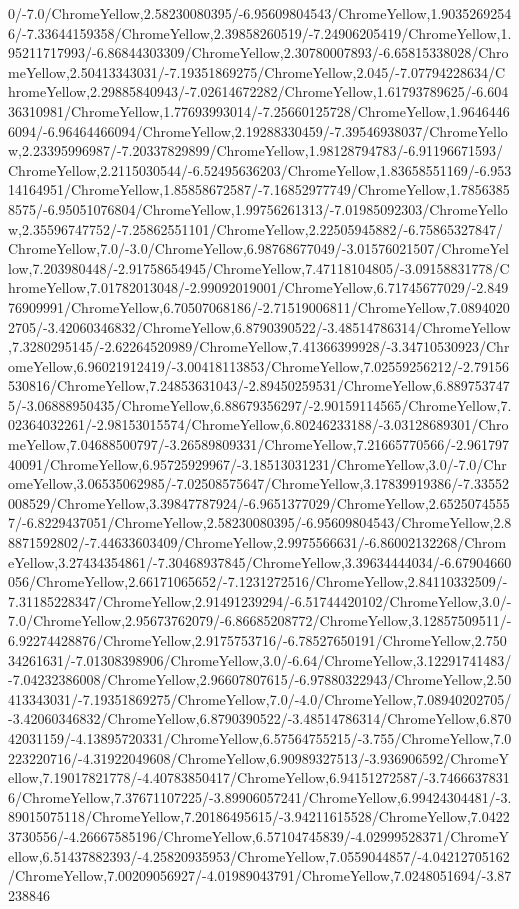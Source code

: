 {\begin{tikzternal}
{0/-7.0/ChromeYellow,2.58230080395/-6.95609804543/ChromeYellow,1.90352692546/-7.33644159358/ChromeYellow,2.39858260519/-7.24906205419/ChromeYellow,1.95211717993/-6.86844303309/ChromeYellow,2.30780007893/-6.65815338028/ChromeYellow,2.50413343031/-7.19351869275/ChromeYellow,2.045/-7.07794228634/ChromeYellow,2.29885840943/-7.02614672282/ChromeYellow,1.61793789625/-6.60436310981/ChromeYellow,1.77693993014/-7.25660125728/ChromeYellow,1.96464466094/-6.96464466094/ChromeYellow,2.19288330459/-7.39546938037/ChromeYellow,2.23395996987/-7.20337829899/ChromeYellow,1.98128794783/-6.91196671593/ChromeYellow,2.2115030544/-6.52495636203/ChromeYellow,1.83658551169/-6.95314164951/ChromeYellow,1.85858672587/-7.16852977749/ChromeYellow,1.78563858575/-6.95051076804/ChromeYellow,1.99756261313/-7.01985092303/ChromeYellow,2.35596747752/-7.25862551101/ChromeYellow,2.22505945882/-6.75865327847/ChromeYellow,7.0/-3.0/ChromeYellow,6.98768677049/-3.01576021507/ChromeYellow,7.203980448/-2.91758654945/ChromeYellow,7.47118104805/-3.09158831778/ChromeYellow,7.01782013048/-2.99092019001/ChromeYellow,6.71745677029/-2.84976909991/ChromeYellow,6.70507068186/-2.71519006811/ChromeYellow,7.08940202705/-3.42060346832/ChromeYellow,6.8790390522/-3.48514786314/ChromeYellow,7.3280295145/-2.62264520989/ChromeYellow,7.41366399928/-3.34710530923/ChromeYellow,6.96021912419/-3.00418113853/ChromeYellow,7.02559256212/-2.79156530816/ChromeYellow,7.24853631043/-2.89450259531/ChromeYellow,6.8897537475/-3.06888950435/ChromeYellow,6.88679356297/-2.90159114565/ChromeYellow,7.02364032261/-2.98153015574/ChromeYellow,6.80246233188/-3.03128689301/ChromeYellow,7.04688500797/-3.26589809331/ChromeYellow,7.21665770566/-2.96179740091/ChromeYellow,6.95725929967/-3.18513031231/ChromeYellow,3.0/-7.0/ChromeYellow,3.06535062985/-7.02508575647/ChromeYellow,3.17839919386/-7.33552008529/ChromeYellow,3.39847787924/-6.9651377029/ChromeYellow,2.65250745557/-6.8229437051/ChromeYellow,2.58230080395/-6.95609804543/ChromeYellow,2.88871592802/-7.44633603409/ChromeYellow,2.9975566631/-6.86002132268/ChromeYellow,3.27434354861/-7.30468937845/ChromeYellow,3.39634444034/-6.67904660056/ChromeYellow,2.66171065652/-7.1231272516/ChromeYellow,2.84110332509/-7.31185228347/ChromeYellow,2.91491239294/-6.51744420102/ChromeYellow,3.0/-7.0/ChromeYellow,2.95673762079/-6.86685208772/ChromeYellow,3.12857509511/-6.92274428876/ChromeYellow,2.9175753716/-6.78527650191/ChromeYellow,2.75034261631/-7.01308398906/ChromeYellow,3.0/-6.64/ChromeYellow,3.12291741483/-7.04232386008/ChromeYellow,2.96607807615/-6.97880322943/ChromeYellow,2.50413343031/-7.19351869275/ChromeYellow,7.0/-4.0/ChromeYellow,7.08940202705/-3.42060346832/ChromeYellow,6.8790390522/-3.48514786314/ChromeYellow,6.87042031159/-4.13895720331/ChromeYellow,6.57564755215/-3.755/ChromeYellow,7.0223220716/-4.31922049608/ChromeYellow,6.90989327513/-3.936906592/ChromeYellow,7.19017821778/-4.40783850417/ChromeYellow,6.94151272587/-3.74666378316/ChromeYellow,7.37671107225/-3.89906057241/ChromeYellow,6.99424304481/-3.89015075118/ChromeYellow,7.20186495615/-3.94211615528/ChromeYellow,7.04223730556/-4.26667585196/ChromeYellow,6.57104745839/-4.02999528371/ChromeYellow,6.51437882393/-4.25820935953/ChromeYellow,7.0559044857/-4.04212705162/ChromeYellow,7.00209056927/-4.01989043791/ChromeYellow,7.0248051694/-3.87238846}
\end{tikzternal}}
